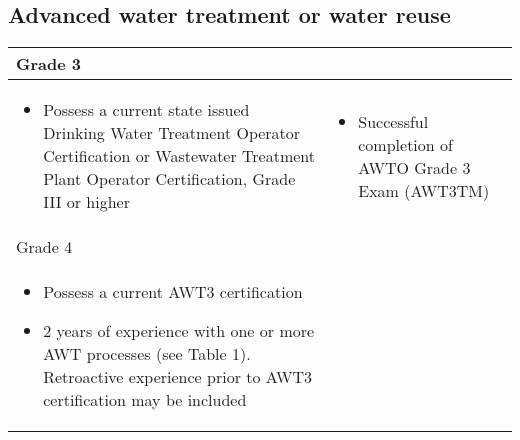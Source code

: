 \subsection{Advanced water treatment or water reuse}
\begin{table}[H]
\captionsetup{justification=centering}
\scriptsize
\begin{tabularx}{\textwidth}{| X | X |}

\hline
\multicolumn{2}{|l|}{Grade 3}                                                                                                                                                                                                                                                                                                                                                                                                   \\
\hline
\begin{itemize}
\item Possess a current state issued Drinking Water Treatment Operator Certification or Wastewater Treatment Plant   Operator Certification, Grade III or higher                                                                                                                                                                                             
\end{itemize} & 
\begin{itemize}
\item Successful completion of AWTO Grade 3 Exam (AWT3TM)
\end{itemize} \\
\hline
\multicolumn{2}{|l|}{Grade 4}                                                                                                                                                                                                                                                                                                                                                                                                   \\
\hline
\begin{itemize}
\item Possess a current AWT3 certification
\item 2 years of   experience with one or more AWT processes (see Table 1). Retroactive   experience prior to AWT3 certification may be included 

\end{itemize}
\end{tabularx}
\end{table}
